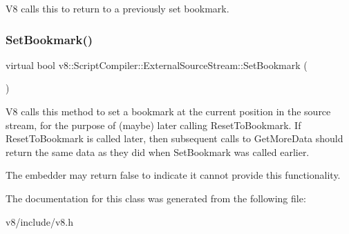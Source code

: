 V8 calls this to return to a previously set bookmark. \mbox{\label{classv8_1_1ScriptCompiler_1_1ExternalSourceStream_a6848508547b3508a2d016738f12561e8}} 
\subsubsection{\texorpdfstring{Set\+Bookmark()}{SetBookmark()}}
{\footnotesize\ttfamily virtual bool v8\+::\+Script\+Compiler\+::\+External\+Source\+Stream\+::\+Set\+Bookmark (\begin{DoxyParamCaption}{ }\end{DoxyParamCaption})\hspace{0.3cm}{\ttfamily [virtual]}}

V8 calls this method to set a \textquotesingle{}bookmark\textquotesingle{} at the current position in the source stream, for the purpose of (maybe) later calling Reset\+To\+Bookmark. If Reset\+To\+Bookmark is called later, then subsequent calls to Get\+More\+Data should return the same data as they did when Set\+Bookmark was called earlier.

The embedder may return \textquotesingle{}false\textquotesingle{} to indicate it cannot provide this functionality. 

The documentation for this class was generated from the following file\+:\begin{DoxyCompactItemize}
\item 
v8/include/v8.\+h\end{DoxyCompactItemize}
